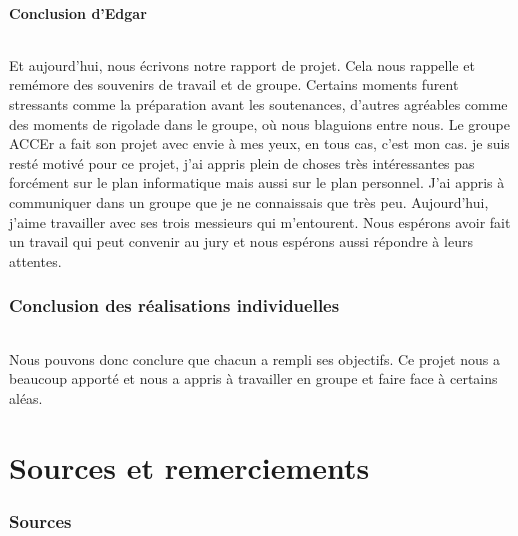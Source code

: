 \documentclass[titlepage, 13px, a4paper]{report}
\begin{document}
\subsection{Conclusion d'Edgar}
\paragraph*{} \hspace{0pt}
Et aujourd’hui, nous écrivons notre rapport de projet. Cela nous rappelle et remémore des souvenirs de travail et 
de groupe. Certains moments furent stressants comme la préparation avant les soutenances, 
d’autres agréables comme des moments de rigolade dans le groupe, où nous blaguions entre nous. Le groupe 
ACCEr a fait son projet avec envie à mes yeux, en tous cas, c’est mon cas. je suis resté motivé pour ce projet, 
j’ai appris plein de choses très intéressantes pas forcément sur le plan informatique mais aussi sur le plan 
personnel. J’ai appris à communiquer dans un groupe que je ne connaissais que très peu. Aujourd’hui, j’aime 
travailler avec ses trois messieurs qui m’entourent. Nous espérons avoir fait un travail qui peut convenir 
au jury et nous espérons aussi répondre à leurs attentes. 

\newpage

\section*{Conclusion des réalisations individuelles}
\paragraph*{} \hspace{0pt}
Nous pouvons donc conclure que chacun a rempli ses objectifs.
Ce projet nous a beaucoup apporté et nous a appris à travailler en groupe et faire face à certains aléas.



\newpage


\part{Sources et remerciements}

\section{Sources}
\end{document}
